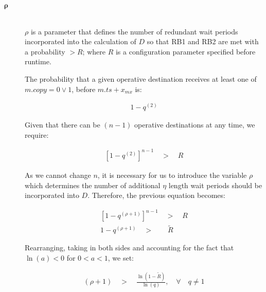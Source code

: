 \begin{description}
        \item[\Huge$\boldsymbol{\rho}$] \hfill \\
        $\rho$ is a parameter that defines the number of redundant wait periods incorporated into the calculation of $D$ so that RB1 and RB2 are met with a probability $> R$; where $R$ is a configuration parameter specified before runtime.  
        
        The probability that a given operative destination receives at least one of $m.copy = 0 \lor 1$, before $m.ts + x_{mx}$ is:
        
        \begin{equation}
            \begin{aligned}
                1 - q^{\left( 2 \right)}
            \end{aligned}
        \end{equation}
        
        Given that there can be $(n - 1)$ operative destinations at any time, we require:
        
        \begin{equation}
            \begin{aligned}
                \left[1 - q^{\left(2 \right)}\right]^{n - 1} \quad > \quad R
            \end{aligned}
        \end{equation}        
        
        As we cannot change $n$, it is necessary for us to introduce the variable $\rho$ which determines the number of additional $\eta$ length wait periods should be incorporated into $D$.  Therefore, the previous equation becomes:
        
         \begin{equation}
            \begin{split}
                \left[1 - q^{\left(\rho + 1 \right)}\right]^{n - 1} \quad > \quad R \\
                1 - q^{\left(\rho + 1\right)} \quad > \quad \quad \tilde{R}
            \end{split}
        \end{equation}   
        
        Rearranging, taking in both sides and accounting for the fact that $\ln(a) < 0$ for  $0 < a < 1$, we set:
        
        \begin{equation}
            \begin{aligned}
                \left(\rho + 1\right) \quad > \quad \frac{\ln\left( 1 - \tilde{R} \right)}{\ln\left(q \right)}, \quad \forall \quad q \neq 1
            \end{aligned}
        \end{equation}


\end{description}

